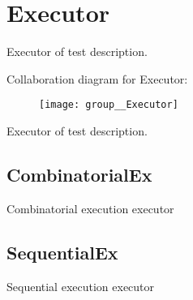 \hypertarget{group__Executor}{\section{Executor}
\label{group__Executor}
}


Executor of test description.  


Collaboration diagram for Executor\-:\nopagebreak
\begin{figure}[H]
\begin{center}
\leavevmode
\texttt{[image: group\_\_Executor]}
\end{center}
\end{figure}
Executor of test description. \hypertarget{group__Executor_CombinatorialEx}{}\subsection{Combinatorial\-Ex}\label{group__Executor_CombinatorialEx}
Combinatorial execution executor\hypertarget{group__Executor_SequentialEx}{}\subsection{Sequential\-Ex}\label{group__Executor_SequentialEx}
Sequential execution executor 